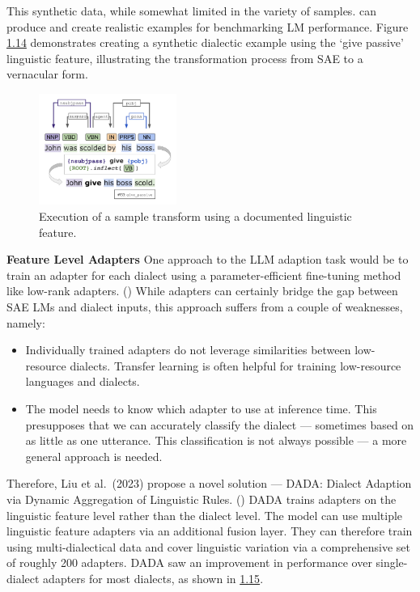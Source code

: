 \documentclass[
  letterpaper,
  DIV=11,
  numbers=noendperiod,
  oneside]{scrreprt}
\theoremstyle{remark}
\begin{document}
This synthetic data, while somewhat limited in the variety of samples.
can produce and create realistic examples for benchmarking LM
performance. Figure \hyperref[fig:synthetic_example]{1.14} demonstrates
creating a synthetic dialectic example using the `give passive'
linguistic feature, illustrating the transformation process from SAE to
a vernacular form.

\begin{figure}

{\centering \includegraphics[width=0.4\textwidth,height=\textheight]{Figures/MV3.png}

}

\caption{Execution of a sample transform using a documented linguistic
feature.}

\end{figure}%

\textbf{Feature Level Adapters} One approach to the LLM adaption task
would be to train an adapter for each dialect using a
parameter-efficient fine-tuning method like low-rank adapters.
() While adapters can certainly
bridge the gap between SAE LMs and dialect inputs, this approach suffers
from a couple of weaknesses, namely:

\begin{itemize}
\item
  Individually trained adapters do not leverage similarities between
  low-resource dialects. Transfer learning is often helpful for training
  low-resource languages and dialects.
\item
  The model needs to know which adapter to use at inference time. This
  presupposes that we can accurately classify the dialect --- sometimes
  based on as little as one utterance. This classification is not always
  possible --- a more general approach is needed.
\end{itemize}

Therefore, Liu et al.~(2023) propose a novel solution --- DADA: Dialect
Adaption via Dynamic Aggregation of Linguistic Rules.
() DADA trains adapters on
the linguistic feature level rather than the dialect level. The model
can use multiple linguistic feature adapters via an additional fusion
layer. They can therefore train using multi-dialectical data and cover
linguistic variation via a comprehensive set of roughly 200 adapters.
DADA saw an improvement in performance over single-dialect adapters for
most dialects, as shown in \hyperref[fig:dada_performance]{1.15}.
\end{document}
